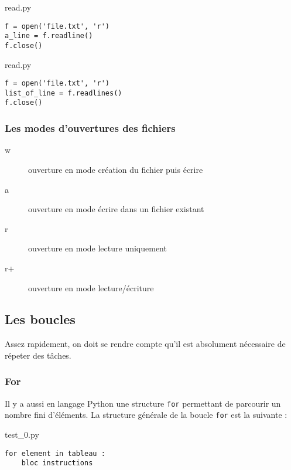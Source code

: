 \vskip 2pt
\begin{center}
  \begin{myterminalbox}[colback=gray!10]{read.py}
\begin{verbatim}
f = open('file.txt', 'r')
a_line = f.readline()
f.close()
\end{verbatim}
  \end{myterminalbox}
\end{center}

\vskip 2pt
\begin{center}
  \begin{myterminalbox}[colback=gray!10]{read.py}
\begin{verbatim}
f = open('file.txt', 'r')
list_of_line = f.readlines()
f.close()
\end{verbatim}
  \end{myterminalbox}
\end{center}


\subsubsection{Les modes d'ouvertures des fichiers}


\begin{description}
\item[w] ouverture en mode création du fichier puis écrire
\item[a] ouverture en mode écrire dans un fichier existant
\item[r] ouverture en mode lecture uniquement
\item[r+] ouverture en mode lecture/écriture
\end{description}







\subsection{Les boucles}

Assez rapidement, on doit se rendre compte qu'il est absolument nécessaire de répeter des tâches.


\subsubsection{For}

Il y a aussi en langage Python une structure \texttt{for} permettant de parcourir un nombre
fini d'éléments.
La structure générale de la boucle \texttt{for} est la suivante :
\vskip 2pt
\begin{center}
  \begin{myterminalbox}[colback=gray!10]{test\_0.py}
\begin{verbatim}
for element in tableau :
    bloc instructions
\end{verbatim}
  \end{myterminalbox}
\end{center}

